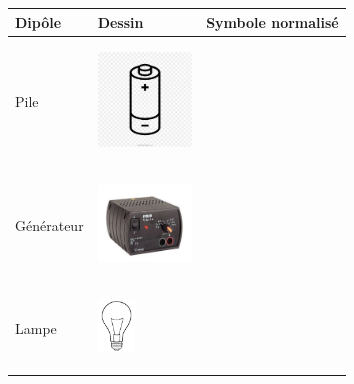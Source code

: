\documentclass[11pt]{article}
\begin{document}
\begin{question}


\end{question}
		\renewcommand{\arraystretch}{4.75}

		\begin{center}
		\begin{tabular}{ |p{6cm}|p{6cm}|p{6cm}|  }
			\hline
			Dipôle 						& Dessin & Symbole normalisé \\\hline\hline
			Pile 						& 
			\begin{minipage}{.3\textwidth}
				\begin{center}
					\includegraphics[width=2.5cm]{pile.jpg}
				\end{center}
			  \end{minipage} &  \\\hline

			Générateur 						& 
			\begin{minipage}{.2\textwidth}
				\begin{center}
					\includegraphics[width=2.5cm]{générateur.jpg}
				\end{center}
			\end{minipage} &  \\\hline

			Lampe 	&
			\begin{minipage}{.3\textwidth}
				\begin{center}
					\includegraphics[width=1cm]{lampe.jpg}
				\end{center}
			  \end{minipage} &  \\\hline


\end{tabular}
\end{center}
\end{document}
